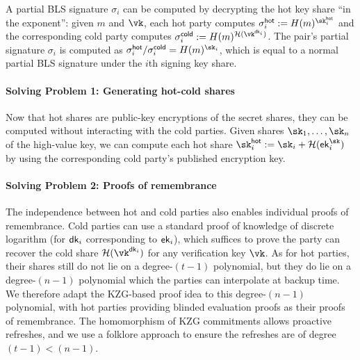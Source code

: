 A partial BLS signature $\sigma_i$ can be computed by decrypting the hot key share ``in the exponent'': given $m$ and $\vk$, each hot party computes $\sigma_i^\hot := \blshash(m)^{\sk_i^\hot}$ and the corresponding cold party computes $\sigma_i^\cold := \blshash(m)^{\lhlhash(\vk^{\dk_i})}$. The pair's partial signature $\sigma_i$ is computed as $\sigma_i^\hot/\sigma_i^\cold = \blshash(m)^{\sk_i}$, which is equal to a normal partial BLS signature under the $i$th signing key share.

\paragraph{Solving Problem 1: Generating hot-cold shares}
Now that hot shares are public-key encryptions of the secret shares, they can be computed without interacting with the cold parties. Given shares $\sk_1, \dots, \sk_n$ of the high-value key, we can compute each hot share $\sk_i^\hot := \sk_i + \lhlhash(\ek_i^{\sk})$ by using the corresponding cold party's published encryption key.


\paragraph{Solving Problem 2: Proofs of remembrance}
The independence between hot and cold parties also enables individual proofs of remembrance.
Cold parties can use a standard proof of knowledge of discrete logarithm (for $\mathsf{dk}_i$ corresponding to $\mathsf{ek}_i$), which suffices to prove the party can recover the cold share $\lhlhash(\vk^{\dk_i})$ for any verification key $\vk$. As for hot parties, their shares still do not lie on a degree-$(t-1)$ polynomial, but they do lie on a degree-$(n-1)$ polynomial which the parties can interpolate at backup time. We therefore adapt the KZG-based proof idea to this degree-$(n-1)$ polynomial, with hot parties providing blinded evaluation proofs as their proofs of remembrance. The homomorphism of KZG commitments allows proactive refreshes, and we use a folklore approach to ensure the refreshes are of degree $(t-1) < (n-1)$.